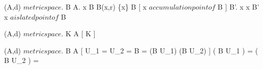{	
	{
	{
		(A,d) $ metric space $.
		B \subset A.
		x \in B
	}
	{
		{
			B(x,r) \setminus \{x\} \cap B \neq \emptyset
		}
	}
	\denote
	{
		[ x $ accumulation point of $ B ] \as B'.
		x \in {} \logicand x \nin B' \as x $ aislated point of $ B
	}


	
	}

	{
	{
		(A,d) $ metric space $.
		K \subset A
	}
	{
		[ K \subset {} ]
		{
		}
	}	}

	{
	{
		(A,d) $ metric space $.
		B \subset A
	}
	{
		[ U_1 =  \logicand U_2 =  \logicand B = (B \cap U_1) \cup (B \cap U_2) ]
		{
			( B \cap U_1 ) = \emptyset \logicor ( B \cap U_2 ) = \emptyset
		}
	}
	}
}